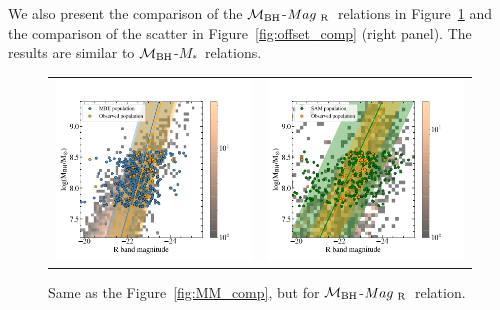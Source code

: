 \documentclass[twocolumn,trackchanges]{aastex63}
\newcommand{\mbh}{$\mathcal M_{\rm BH}$}
\newcommand{\mr}{$Mag_{\rm ~R}$}
\newcommand{\mstar}{{$M_*$}}
\begin{document}

We also present the comparison of the \mbh-\mr\ relations in Figure~\ref{fig:ML_comp} and the comparison of the scatter in Figure~\ref{fig:offset_comp} (right panel). The results are similar to \mbh-\mstar\ relations.

\begin{figure}[t]%
\begin{tabular}{c c}
\includegraphics[trim = 0mm 0mm 61mm 0mm, clip, width=0.47\linewidth]{MBII_ML.png} &
\includegraphics[trim = 0mm 0mm 61mm 0mm, clip, width=0.47\linewidth]{SAM_ML_consider_nois.png} \\
\end{tabular}
\caption{Same as the Figure~\ref{fig:MM_comp}, but for \mbh-\mr\ relation.}
\label{fig:ML_comp}
\end{figure}
\end{document}
